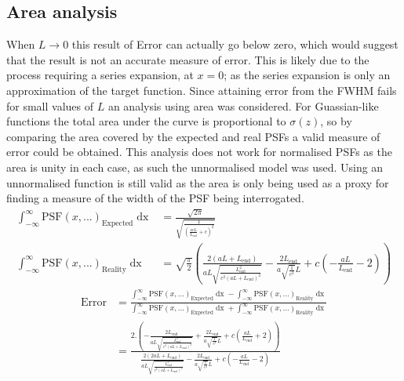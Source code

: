 \subsection{Area analysis}
When $L\to0$ this result of Error can actually go below zero, which would suggest that the result is not an accurate measure of error.
This is likely due to the process requiring a series expansion, at $x=0$; as the series expansion is only an approximation of the target function.
Since attaining error from the FWHM fails for small values of $L$ an analysis using area was considered.
For Guassian-like functions the total area under the curve is proportional to $\sigma(z)$, so by comparing the area covered by the expected and real PSFs a valid measure of error could be obtained.
This analysis does not work for normalised PSFs as the area is unity in each case, as such the unnormalised model was used.
Using an unnormalised function is still valid as the area is only being used as a proxy for finding a measure of the width of the PSF being interrogated.
\begin{align*}
  \int_{-\infty}^{\infty} \text{PSF}(x,...)_{\text{Expected}} \mathop{dx} &= \frac{\sqrt{2 \pi }}{\sqrt{\frac{1}{\left(\frac{a c L}{L_{\text{end}}}+c\right)^2}}}\\
  \int_{-\infty}^{\infty} \text{PSF}(x,...)_{\text{Reality}} \mathop{dx} &=\sqrt{\frac{\pi }{2}} \left(\frac{2 (a L+L_{\text{end}})}{a L \sqrt{\frac{L_{\text{end}}^2}{c^2 (a L+L_{\text{end}})^2}}}-\frac{2 L_{\text{end}}}{a \sqrt{\frac{1}{c^2}} L}+c \left(-\frac{a L}{L_{\text{end}}}-2\right)\right)
\end{align*}
\begin{align*}
  \text{Error} &= \frac{\int_{-\infty}^{\infty} \text{PSF}(x,...)_{\text{Expected}} \mathop{dx} - \int_{-\infty}^{\infty} \text{PSF}(x,...)_{\text{Reality}}\mathop{dx}}
  {\int_{-\infty}^{\infty} \text{PSF}(x,...)_{\text{Expected}} \mathop{dx} + \int_{-\infty}^{\infty} \text{PSF}(x,...)_{\text{Reality}}\mathop{dx}} \\
  &= \frac{2. \left(-\frac{2 L_{\text{end}}}{a L \sqrt{\frac{L_{\text{end}}^2}{c^2 (a L+L_{\text{end}})^2}}}+\frac{2 L_{\text{end}}}{a \sqrt{\frac{1}{c^2}} L}+c \left(\frac{a L}{L_{\text{end}}}+2\right)\right)}{\frac{2 (2 a L+L_{\text{end}})}{a L \sqrt{\frac{L_{\text{end}}^2}{c^2 (a L+L_{\text{end}})^2}}}-\frac{2 L_{\text{end}}}{a \sqrt{\frac{1}{c^2}} L}+c \left(-\frac{a L}{L_{\text{end}}}-2\right)}
\end{align*}

